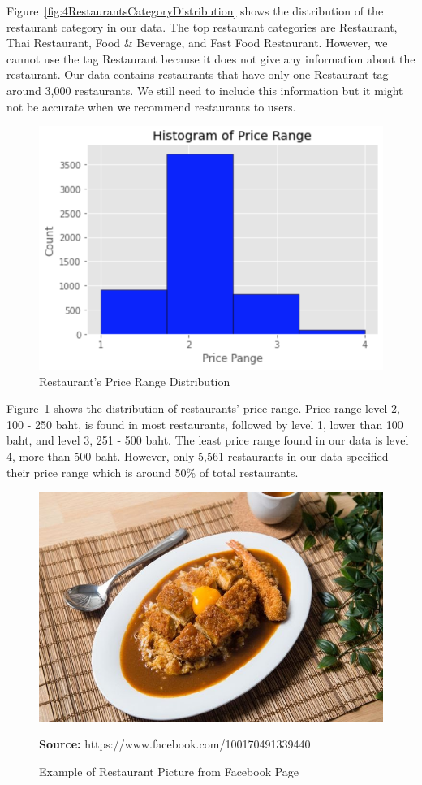 \documentclass[12pt,oneside,openright,a4paper]{cpe-english-project}
\newcommand*{\captionsource}[2]{%
  \caption[{#1}]{#1}\vspace{-8pt}
  \textbf{Source:} #2}
\begin{document}
Figure~\ref{fig:4RestaurantsCategoryDistribution} shows the distribution of the restaurant category in our data. The top restaurant categories are Restaurant, Thai Restaurant, Food \& Beverage, and Fast Food Restaurant. However, we cannot use the tag Restaurant because it does not give any information about the restaurant. Our data contains restaurants that have only one Restaurant tag around 3,000 restaurants. We still need to include this information but it might not be accurate when we recommend restaurants to users.

\begin{figure}[H]\centering
\includegraphics[width=350pt]{./images/4RestaurantsPriceRangeDistribution.png}
\caption{Restaurant’s Price Range Distribution}\label{fig:4RestaurantsPriceRangeDistribution}
\end{figure}

Figure~\ref{fig:4RestaurantsPriceRangeDistribution} shows the distribution of restaurants' price range. Price range level 2, 100 - 250 baht, is found in most restaurants, followed by level 1, lower than 100 baht, and level 3, 251 - 500 baht. The least price range found in our data is level 4, more than 500 baht. However, only 5,561 restaurants in our data specified their price range which is around 50\% of total restaurants.

\begin{figure}[H]\centering
\includegraphics[width=350pt]{./images/4ExampleofRestaurantPicturefromFacebookPage.jpeg}
\captionsource{Example of Restaurant Picture from Facebook Page}{https://www.facebook.com/100170491339440}\label{fig:4ExampleofRestaurantPicturefromFacebookPage}
\end{figure}
\end{document}
